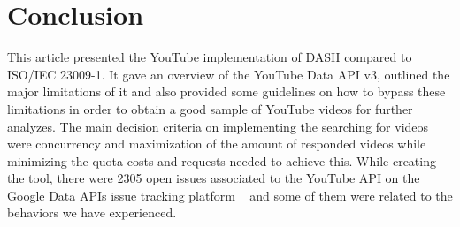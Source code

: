 \section{Conclusion}
This article presented the YouTube implementation of DASH compared to 
ISO/IEC 23009-1. It gave an overview of the YouTube Data API v3, outlined
the major limitations of it and also provided some guidelines on how to
bypass these limitations in order to obtain a good sample of YouTube
videos for further analyzes. The main decision criteria on implementing
the searching for videos were concurrency and maximization of the amount
of responded videos while minimizing the quota costs and requests needed
to achieve this. While creating the tool, there were 2305 open issues
associated to the YouTube API on the Google Data APIs issue tracking
platform ~\cite{conclusion:gdataissue} and some of them were related to
the behaviors we have experienced.
